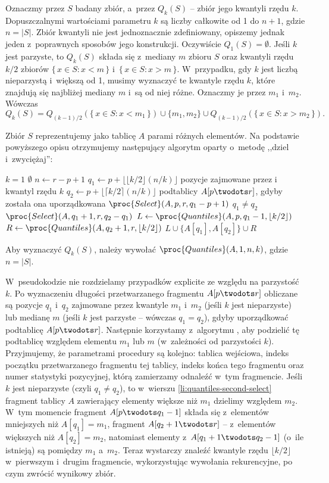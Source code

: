 \exercise %
Oznaczmy przez $S$ badany zbiór, a~przez $Q_k(S)$ -- zbiór jego kwantyli rzędu $k$.
Dopuszczalnymi wartościami parametru $k$ są liczby całkowite od 1 do $n+1$, gdzie $n=|S|$.
Zbiór kwantyli nie jest jednoznacznie zdefiniowany, opiszemy jednak jeden z~poprawnych sposobów jego konstrukcji.
Oczywiście $Q_1(S)=\emptyset$.
Jeśli $k$ jest parzyste, to $Q_k(S)$ składa się z~mediany $m$ zbioru $S$ oraz kwantyli rzędu $k/2$ zbiorów $\{\,x\in S:x<m\,\}$ i~$\{\,x\in S:x>m\,\}$.
W~przypadku, gdy $k$ jest liczbą nieparzystą i~większą od 1, musimy wyznaczyć te kwantyle rzędu $k$, które znajdują się najbliżej mediany $m$ i~są od niej różne.
Oznaczmy je przez $m_1$ i~$m_2$.
Wówczas
\[
	Q_k(S) = Q_{(k-1)/2}(\{\,x\in S:x<m_1\,\})\cup\{m_1,m_2\}\cup Q_{(k-1)/2}(\{\,x\in S:x>m_2\,\}).
\]

Zbiór $S$ reprezentujemy jako tablicę $A$ parami różnych elementów.
Na podstawie powyższego opisu otrzymujemy następujący algorytm oparty o~metodę ,,dziel i~zwyciężaj'':
\begin{codebox}
\li	\If $k=1$
\li		\Then \Return $\emptyset$
		\End
\li	$n\gets r-p+1$
\li	$q_1\gets p+\lfloor\lfloor k/2\rfloor(n/k)\rfloor$ \>\>\>\>\>\>\Comment pozycje zajmowane przez  i~ kwantyl rzędu $k$
\li	$q_2\gets p+\lfloor\lceil k/2\rceil(n/k)\rfloor$ \>\>\>\>\>\>\>podtablicy $A[p\twodots r]$, gdyby została ona uporządkowana
\li	$\proc{Select}(A,p,r,q_1-p+1)$
\li	\If $q_1\ne q_2$
\li		\Then $\proc{Select}(A,q_1+1,r,q_2-q_1)$ \label{li:quantiles-second-select}
		\End
\li	$L\gets\proc{Quantiles}(A,p,q_1-1,\lfloor k/2\rfloor)$
\li	$R\gets\proc{Quantiles}(A,q_2+1,r,\lfloor k/2\rfloor)$
\li	\Return $L\cup\{A[q_1],A[q_2]\}\cup R$
\end{codebox}
Aby wyznaczyć $Q_k(S)$, należy wywołać $\proc{Quantiles}(A,1,n,k)$, gdzie $n=|S|$.

W~pseudokodzie nie rozdzielamy przypadków explicite ze względu na parzystość $k$.
Po wyznaczeniu długości przetwarzanego fragmentu $A[p\twodots r]$ obliczane są pozycje $q_1$ i~$q_2$ zajmowane przez kwantyle $m_1$ i~$m_2$ (jeśli $k$ jest nieparzyste) lub medianę $m$ (jeśli $k$ jest parzyste -- wówczas $q_1=q_2$), gdyby uporządkować podtablicę $A[p\twodots r]$.
Następnie korzystamy z~algorytmu , aby podzielić tę podtablicę względem elementu $m_1$ lub $m$ (w~zależności od parzystości $k$).
Przyjmujemy, że parametrami procedury  są kolejno: tablica wejściowa, indeks początku przetwarzanego fragmentu tej tablicy, indeks końca tego fragmentu oraz numer statystyki pozycyjnej, którą zamierzamy odnaleźć w~tym fragmencie.
Jeśli $k$ jest nieparzyste (czyli $q_1\ne q_2$), to w~wierszu \ref{li:quantiles-second-select} fragment tablicy $A$ zawierający elementy większe niż $m_1$ dzielimy względem $m_2$.
W~tym momencie fragment $A[p\twodots q_1-1]$ składa się z~elementów mniejszych niż $A[q_1]=m_1$, fragment $A[q_2+1\twodots r]$ -- z~elementów większych niż $A[q_2]=m_2$, natomiast elementy z~$A[q_1+1\twodots q_2-1]$ (o~ile istnieją) są pomiędzy $m_1$ a~$m_2$.
Teraz wystarczy znaleźć kwantyle rzędu $\lfloor k/2\rfloor$ w~pierwszym i~drugim fragmencie, wykorzystując wywołania rekurencyjne, po czym zwrócić wynikowy zbiór.

